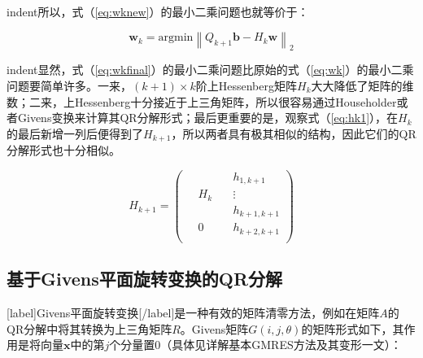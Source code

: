 \documentclass[UTF8,nofonts]{ctexart}
\begin{document}
indent所以，式（\ref{eq:wknew}）的最小二乘问题也就等价于：

\begin{equation}
\label{eq:wkfinal}
\boldsymbol{w}_k=\text{argmin}\left\|Q_{k+1}\boldsymbol{b}-H_k\boldsymbol{w}\right\|_2
\end{equation}

indent显然，式（\ref{eq:wkfinal}）的最小二乘问题比原始的式（\ref{eq:wk}）的最小二乘问题要简单许多。一来，$(k+1) \times k$阶上Hessenberg矩阵$H_k$大大降低了矩阵的维数；二来，上Hessenberg十分接近于上三角矩阵，所以很容易通过Householder或者Givens变换来计算其QR分解形式；最后更重要的是，观察式（\ref{eq:hk1}），在$H_k$的最后新增一列后便得到了$H_{k+1}$，所以两者具有极其相似的结构，因此它们的QR分解形式也十分相似。

\begin{equation}
\label{eq:hk1}
H_{k+1}=
\begin{pmatrix}
	~ & ~ & ~ & h_{1,k+1} \\
	~ & H_k & ~ & \vdots \\
	~ & ~ & ~ & h_{k+1,k+1} \\
	~ & 0 & ~ & h_{k+2,k+1} \\
\end{pmatrix}
\end{equation}

\subsection*{基于Givens平面旋转变换的QR分解}

[label]Givens平面旋转变换[/label]是一种有效的矩阵清零方法，例如在矩阵$A$的QR分解中将其转换为上三角矩阵$R$。Givens矩阵$G(i,j,\theta)$的矩阵形式如下，其作用是将向量$\boldsymbol{x}$中的第$j$个分量置$0$（具体见详解基本GMRES方法及其变形一文）：
\end{document}
